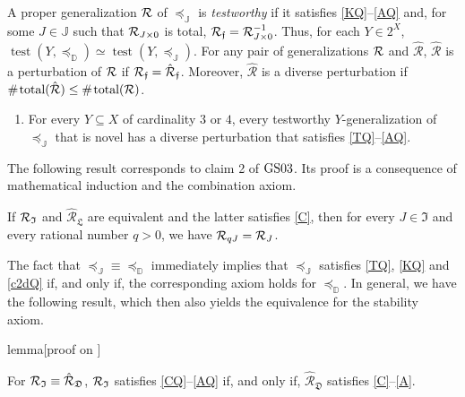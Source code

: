 \documentclass[12pt,a4paper,twoside]{article}
\newcommand{\gsii}{$\textup{GS03}$}
\newcommand{\novel}{\mathfrak f}
\newcommand{\test}{\operatorname{test}}
\newcommand{\preceqb}{\mathbin{\preceq}}
\newcommand{\countof}{\mathbin{\#}\hskip1pt}
\newcommand{\ext}{\mathrel{\mc R}}
\newcommand{\extb}{\mathbin{\mc R}}
\newcommand{\hext}{\mathrel{\hat{\mathrel{\mathcal R}}}}
\newcommand{\hextb}{\mathbin{\hat{\mathbin{\mathcal R}}}}
\newcommand{\total}{\textup{total}}
\newcommand{\mbbd}{{\mathds D}}
\newcommand{\dpp}{{\mathfrak D}}
\newcommand{\mbbipp}{{\mathfrak L}}
\newcommand{\mbbj}{\mathds J}
\newcommand{\mbbjpp}{\mathfrak I}
\begin{document}
\begin{appendices}
\begin{enumerate}[label=\textup{A\arabic*}$^{'\flat}$,resume]

\end{enumerate}


A proper {generalization} $\ext$ of $\preceqb _{ \mbbj }$ is \emph{testworthy} if
it satisfies \ref{KQ}--\ref{AQ} and, for some $J\in \mbbj$ such that
$\ext_{J\times 0 }$ is total, $\extb_{\novel} = \extb_{J\times 0}^{-1}$. Thus,
for each $Y \in 2 ^ { X }$,
$\test ( Y , \preceqb _{ \mbbd } ) \simeq \test ( Y , \preceqb _{ \mbbj
})$. For any pair of {generalization}s $\ext$ and $\hext$, $\hext$ is a perturbation
of $\ext$ if $\extb_{\novel} = \hextb_{\novel}$. Moreover, $\hext$ is a
{{diverse}} perturbation if
$\countof \total (\hext) \leq \countof \total (\ext)$.
\begin{enumerate}[label=\textit{4}-\textup{P}$^{\flat}$]
\item\label{PQ} For every $Y \subseteq X$ of cardinality $3$ or $4$, every
  testworthy $Y$-{generalization} of $\preceqb _{ \mbbj }$ that is novel has a
  {{diverse}} perturbation that satisfies \ref{TQ}–\ref{AQ}.
\end{enumerate}


The following result corresponds to claim 2 of \gsii. Its proof is a consequence
of mathematical induction and the combination axiom.
\begin{lemma}\label{lem-coneQ}

  If $\ext _ \mbbjpp$ and $\hext _ \mbbipp$ are equivalent and the latter
satisfies \ref{C}, then for every $J \in \mbbjpp$ and every rational number
$q >0$, we have $\extb _{ q J }  =  \extb _{J}$.

\end{lemma}
The fact that $\preceqb_{\mbbj}\equiv \preceqb_{\mbbd}$ immediately implies
that $\preceqb_{\mbbj}$ satisfies \ref{TQ}, \ref{KQ} and \ref{c2dQ} if, and
only if, the corresponding axiom holds for $\preceq_{\mbbd}$. In general, we
have the following result, which then also yields the equivalence for the
{stability} axiom.

\begin{theoremEnd}{lemma}[proof on ]
  \label{lem-axiomsQ}

  For $\extb _{ \mbbjpp } \equiv \hextb _{ \dpp }$, $\ext _ { \mbbjpp}$ satisfies
  \ref{CQ}--\ref{AQ} if, and only if, $\hext_{\dpp}$ satisfies
  \ref{C}--\ref{A}.
\end{theoremEnd}


\end{appendices}
\end{document}
